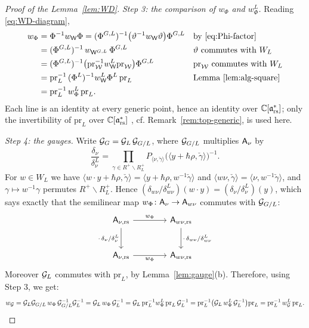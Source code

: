 \documentclass{article}
\theoremstyle{plain}
\theoremstyle{definition}
\theoremstyle{remark}
\numberwithin{equation}{section}
\begin{document}
\begin{proof}[Proof of the Lemma~\ref{lem:WD}]
\emph{Step 3: the comparison of $w_\Phi$ and $w^L_\Phi$.} Reading \eqref{eq:WD-diagram},
\[
\begin{aligned}
w_\Phi&=\Phi^{-1}w_{\mathsf W}\Phi=(\Phi^{G,L})^{-1}\bigl(\vartheta^{-1}w_{\mathsf W}\vartheta\bigr)\Phi^{G,L} &&\text{by \eqref{eq:Phi-factor}}\\
&=(\Phi^{G,L})^{-1}\,w_{\mathsf W^{G,L}}\,\Phi^{G,L} &&\text{$\vartheta$ commutes with $W_L$}\\
&=(\Phi^{G,L})^{-1}\bigl(\mathrm{pr}_{\mathcal W}^{-1}w_{\mathsf W}^L\mathrm{pr}_{\mathcal W}\bigr)\Phi^{G,L} &&\text{$\mathrm{pr}_{\mathcal W}$ commutes with $W_L$}\\
&=\mathrm{pr}_L^{-1}\,(\Phi^L)^{-1}w_{\mathsf W}^L\Phi^L\,\mathrm{pr}_L &&\text{Lemma~\ref{lem:alg-square}}\\
&=\mathrm{pr}_L^{-1}\,w^L_\Phi\,\mathrm{pr}_L .
\end{aligned}
\]
Each line is an identity at every generic point, hence an identity over $\mathbb{C}[\mathfrak{a}^*_{\mathrm{rs}}]$; only the invertibility of $\mathrm{pr}_L$ over $\mathbb{C}[\mathfrak{a}^*_{\mathrm{rs}}]$ , cf. Remark~\ref{rem:top-generic}, is used here.

\emph{Step 4: the gauges.} Write $\mathcal G_G=\mathcal G_L\,\mathcal G_{G/L}$, where $\mathcal G_{G/L}$ multiplies $\mathsf A_\nu$ by
\[
\frac{\delta_\nu}{\delta^L_\nu}=\prod_{\gamma\in R^+\smallsetminus R^+_L}P_{\langle\nu,\check\gamma\rangle}\bigl(\langle y+\hbar\rho,\check\gamma\rangle\bigr)^{-1}.
\]
For $w\in W_L$ we have $\langle w\cdot y+\hbar\rho,\check\gamma\rangle=\langle y+\hbar\rho,w^{-1}\check\gamma\rangle$ and $\langle w\nu,\check\gamma\rangle=\langle\nu,w^{-1}\check\gamma\rangle$, and $\gamma\mapsto w^{-1}\gamma$ permutes $R^+\smallsetminus R^+_L$. Hence $(\delta_{w\nu}/\delta^L_{w\nu})(w\cdot y)=(\delta_\nu/\delta^L_\nu)(y)$, which says exactly that the semilinear map $w_\Phi\colon\mathsf A_\nu\to\mathsf A_{w\nu}$ commutes with $\mathcal G_{G/L}$:
\[
\begin{tikzcd}[column sep=4em,row sep=2.5em]
\sfA_{\nu,\rs}\arrow[r,"w_\Phi"]\arrow[d,"\cdot\,\delta_\nu/\delta^L_\nu"'] & \sfA_{w\nu,\rs}\arrow[d,"\cdot\,\delta_{w\nu}/\delta^L_{w\nu}"]\\
\sfA_{\nu,\rs}\arrow[r,"w_\Phi"'] & \sfA_{w\nu,\rs}
\end{tikzcd}
\]
Moreover $\mathcal G_L$ commutes with $\mathrm{pr}_L$, by Lemma~\ref{lem:gauge}(b). Therefore, using Step 3, we get:
\[
w_\mathcal G=\mathcal G_L\mathcal G_{G/L}\,w_\Phi\,\mathcal G_{G/L}^{-1}\mathcal G_L^{-1}=\mathcal G_L\,w_\Phi\,\mathcal G_L^{-1}
=\mathcal G_L\,\mathrm{pr}_L^{-1}w^L_\Phi\,\mathrm{pr}_L\,\mathcal G_L^{-1}=\mathrm{pr}_L^{-1}\bigl(\mathcal G_L\,w^L_\Phi\,\mathcal G_L^{-1}\bigr)\mathrm{pr}_L=\mathrm{pr}_L^{-1}\,w^L_\mathcal G\,\mathrm{pr}_L.\qedhere
\]
\end{proof}
\end{document}
